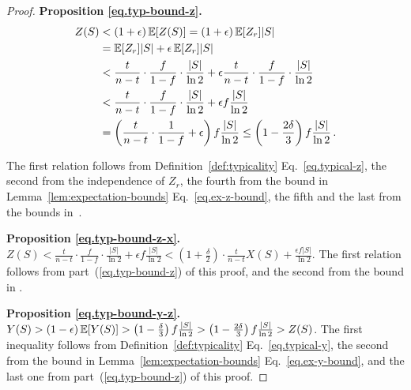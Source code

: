 \begin{proof}
  \textbf{Proposition \ref{eq.typ-bound-z}.}
  \begin{align*}
    Z(S) &< (1 + \epsilon) \mathop{{}\mathbb{E}}[Z(S)] = (1 + \epsilon) \mathop{{}\mathbb{E}}[Z_r] |S| \\
         &= \mathop{{}\mathbb{E}}[Z_r] |S| + \epsilon \mathop{{}\mathbb{E}}[Z_r] |S|\\
         &< \frac{t}{n - t} \cdot \frac{f}{1 - f} \cdot \frac{|S|}{\ln2} + \epsilon \frac{t}{n - t} \cdot \frac{f}{1 - f} \cdot \frac{|S|}{\ln2} \\
         &< \frac{t}{n - t} \cdot \frac{f}{1 - f} \cdot \frac{|S|}{\ln2} + \epsilon f \frac{|S|}{\ln2} \\
         &= \left(\frac{t}{n - t} \cdot \frac{1}{1 - f} + \epsilon \right) f \frac{|S|}{\ln2}
         \leq \left(1 - \frac{2 \delta}{3}\right) f \frac{|S|}{\ln2}\,.
  \end{align*}

  The first relation follows from Definition~\ref{def:typicality} Eq.~\ref{eq.typical-z},
  the second from the independence of $Z_r$, the fourth from
  the bound in Lemma~\ref{lem:expectation-bounds} Eq.~\ref{eq.ex-z-bound},
  the fifth and the last from the bounds in~\cite[Section 13.2.2]{blockchain-foundations}.

  \textbf{Proposition \ref{eq.typ-bound-z-x}.}
  $
    Z(S) < \frac{t}{n - t} \cdot \frac{f}{1 - f} \cdot \frac{|S|}{\ln2} + \epsilon f \frac{|S|}{\ln2}
         < \left(1 + \frac{\delta}{2}\right) \cdot \frac{t}{n - t} X(S) + \frac{\epsilon f |S|}{\ln2}
  $.
  The first relation follows from part~(\ref{eq.typ-bound-z}) of this proof,
  and the second from the bound in \cite[Lemma 11(c)]{backbone}.

  \textbf{Proposition \ref{eq.typ-bound-y-z}.}
  $Y(S) > (1 - \epsilon)\mathop{{}\mathbb{E}}[Y(S)]
         > \left(1 - \frac{\delta}{3}\right) f \frac{|S|}{\ln2}
         > \left(1 - \frac{2\delta}{3}\right) f \frac{|S|}{\ln2}
         > Z(S)$.
  The first inequality follows from Definition~\ref{def:typicality} Eq.~\ref{eq.typical-y},
  the second from the bound in Lemma~\ref{lem:expectation-bounds} Eq.~\ref{eq.ex-y-bound},
  and the last one from part~(\ref{eq.typ-bound-z}) of this proof.
  \Qed
\end{proof}

